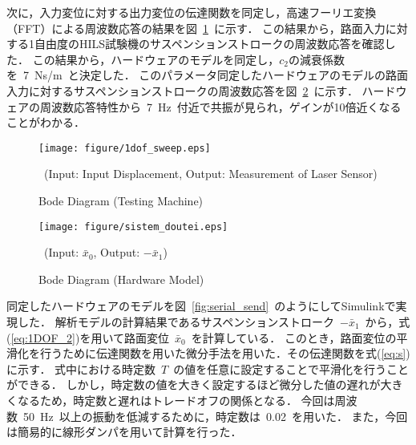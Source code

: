 \documentclass[a4paper,12pt]{article_vdlab_sotsuron}
\begin{document}
\newpage
次に，入力変位に対する出力変位の伝達関数を同定し，高速フーリエ変換（FFT）による周波数応答の結果を図~\ref{fig:1dof_sweep}~に示す．
この結果から，路面入力に対する1自由度のHILS試験機のサスペンションストロークの周波数応答を確認した．
この結果から，ハードウェアのモデルを同定し，$c_2$の減衰係数を~7~Ns/m~と決定した．
このパラメータ同定したハードウェアのモデルの路面入力に対するサスペンションストロークの周波数応答を図~\ref{fig:sistem_sweep}~に示す．
ハードウェアの周波数応答特性から~7~Hz~付近で共振が見られ，ゲインが10倍近くなることがわかる．
\vspace{10mm}
\begin{figure}[h]
  \begin{center}
   \texttt{[image: figure/1dof\_sweep.eps]}
  \vspace{2mm}
\caption{Bode Diagram (Testing Machine)}
\  (Input: Input Displacement, Output: Measurement of Laser Sensor)
  \label{fig:1dof_sweep}
  \end{center}
\end{figure}
\vspace{10mm}
\begin{figure}[h]
  \begin{center}
   \texttt{[image: figure/sistem\_doutei.eps]}
  \vspace{2mm}
\caption{Bode Diagram (Hardware Model)}
\  (Input: $\bar{x}_0$, Output: $-\bar{x}_1$)
  \label{fig:sistem_sweep}
  \end{center}
\end{figure}
\newpage
同定したハードウェアのモデルを図~\ref{fig:serial_send}~のようにしてSimulinkで実現した．
解析モデルの計算結果であるサスペンションストローク~$-{\bar{x}}_1$~から，式(\ref{eq:1DOF_2})を用いて路面変位~$\bar{x}_0$~を計算している．
このとき，路面変位の平滑化を行うために伝達関数を用いた微分手法を用いた．その伝達関数を式(\ref{eq:s})に示す．
式中における時定数~$T$~の値を任意に設定することで平滑化を行うことができる．
しかし，時定数の値を大きく設定するほど微分した値の遅れが大きくなるため，時定数と遅れはトレードオフの関係となる．
今回は周波数~50~Hz~以上の振動を低減するために，時定数は~0.02~を用いた．
また，今回は簡易的に線形ダンパを用いて計算を行った．
\end{document}
